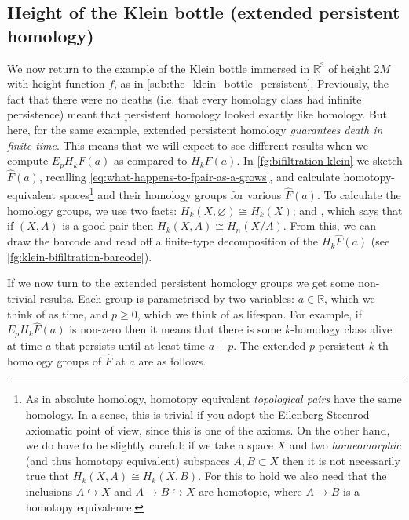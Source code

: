 \documentclass[12pt]{article}
\numberwithin{equation}{subsection}
\numberwithin{theorem}{subsection}
\numberwithin{lemma}{subsection}
\numberwithin{corollary}{subsection}
\numberwithin{definition}{subsection}
\numberwithin{example}{subsection}
\numberwithin{note}{subsection}
\newcommand{\rr}{\mathbb{R}}
\begin{document}


        \subsection{Height of the Klein bottle (extended persistent homology)} %
        \label{sub:the_klein_bottle_extended_persistent}

            We now return to the example of the Klein bottle immersed in $\rr^3$ of height $2M$ with height function $f$, as in \cref{sub:the_klein_bottle_persistent}.
            Previously, the fact that there were no deaths (i.e. that every homology class had infinite persistence) meant that persistent homology looked exactly like homology.
            But here, for the same example, extended persistent homology \emph{guarantees death in finite time}.
            This means that we will expect to see different results when we compute $E_pH_kF(a)$ as compared to $H_kF(a)$.
            In \cref{fg:bifiltration-klein} we sketch $\widehat{F}(a)$, recalling \cref{eq:what-happens-to-fpair-as-a-grows}, and calculate homotopy-equivalent spaces\footnote{
                As in absolute homology, homotopy equivalent \emph{topological pairs} have the same homology.
                In a sense, this is trivial if you adopt the Eilenberg-Steenrod axiomatic point of view, since this is one of the axioms.
                On the other hand, we do have to be slightly careful: if we take a space $X$ and two \emph{homeomorphic} (and thus homotopy equivalent) subspaces $A,B\subset X$ then it is not necessarily true that $H_k(X,A)\cong H_k(X,B)$.
                For this to hold we also need that the inclusions $A\hookrightarrow X$ and $A\to B\hookrightarrow X$ are homotopic, where $A\to B$ is a homotopy equivalence.
            } and their homology groups for various $\widehat{F}(a)$.
            To calculate the homology groups, we use two facts: $H_k(X,\varnothing)\cong H_k(X)$; and \cite[Proposition~2.22~\&~Proposition~A.5]{hatcher2002algebraic}, which says that if $(X,A)$ is a good pair then $H_k(X,A)\cong\widetilde{H}_n(X/A)$.
            From this, we can draw the barcode and read off a finite-type decomposition of the $H_k\widehat{F}(a)$ (see \cref{fg:klein-bifiltration-barcode}).

            If we now turn to the extended persistent homology groups we get some non-trivial results.
            Each group is parametrised by two variables: $a\in\rr$, which we think of as time, and $p\geqslant0$, which we think of as lifespan.
            For example, if $E_pH_k\widehat{F}(a)$ is non-zero then it means that there is some $k$-homology class alive at time $a$ that persists until at least time $a+p$.
            The extended $p$-persistent $k$-th homology groups of $\widehat{F}$ at $a$ are as follows.
\end{document}
